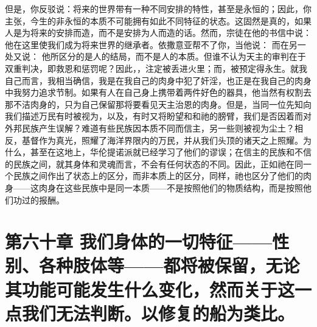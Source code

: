 但是，你反驳说：将来的世界带有一种不同安排的特性，甚至是永恒的；因此，你主张，今生的非永恒的本质不可能拥有如此不同特征的状态。这固然是真的，如果人是为将来的安排而造，而不是安排为人而造的话。然而，宗徒在他的书信中说： 他在这里使我们成为将来世界的继承者。依撒意亚帮不了你，当他说： 而在另一处又说： 他所区分的是人的结局，而不是人的本质。但谁不认为天主的审判在于双重判决，即救恩和惩罚呢？因此，，注定被丢进火里；而，被预定得永生。就我自己而言，我相当确信，我是在我自己的肉身中犯了奸淫，也正是在我自己的肉身中我努力追求节制。如果有人在自己身上携带着两件好色的器具，他当然有权割去那不洁肉身的，只为自己保留那将要看见天主治恩的肉身。但是，当同一位先知向我们描述万民有时被视为，以及，有时又将盼望和和祂的膀臂，我们是否因着而对外邦民族产生误解？难道有些民族因本质不同而信主，另一些则被视为尘土？相反，基督作为真光，照耀了海洋界限内的万民，并从我们头顶的诸天之上照耀。为什么，甚至在这地上，华伦提诺派就已经学习了他们的谬误；在信主的民族和不信的民族之间，就其身体和灵魂而言，不会有任何状态的不同。因此，正如祂在同一个民族之间作出了状态上的区分，而非本质上的区分，同样，祂也区分了他们的肉身——这肉身在这些民族中是同一本质——不是按照他们的物质结构，而是按照他们功过的报酬。\par


\section{第六十章 我们身体的一切特征——性别、各种肢体等——都将被保留，无论其功能可能发生什么变化，然而关于这一点我们无法判断。以修复的船为类比。}

